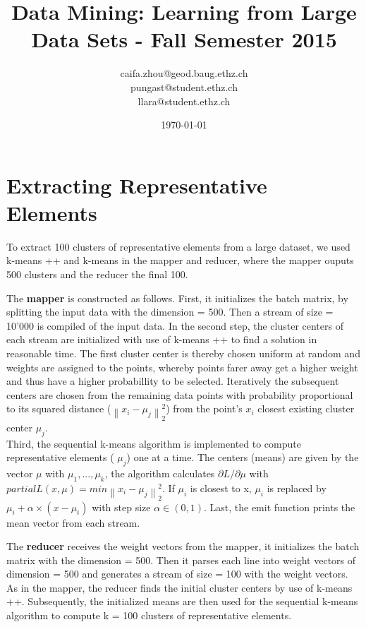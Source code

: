 \documentclass[a4paper, 11pt]{article}
\title{Data Mining: Learning from Large Data Sets - Fall Semester 2015}
\author{caifa.zhou@geod.baug.ethz.ch\\ pungast@student.ethz.ch\\ llara@student.ethz.ch\\}
\date{\today}
\begin{document}
\maketitle

\section*{Extracting Representative Elements} 

To extract 100 clusters of  representative elements from a large dataset, we used k-means ++ and k-means in the mapper and reducer, where the mapper ouputs 500 clusters and the reducer the final 100.

The \textbf{mapper} is constructed as follows. First, it initializes the batch matrix, by splitting the input data with the dimension = 500. Then a stream of size = 10'000 is compiled of the input data.
In the second step, the cluster centers of each stream are initialized with use of k-means ++ to find a solution in reasonable time. The first cluster center is thereby chosen uniform at random and weights are assigned to the points, whereby points farer away get a higher weight and thus have a higher probabillity to be selected. Iteratively the subsequent centers are chosen from the remaining data points with probability proportional to its squared distance ($\left \| x_{i} - \mu_{j} \right \|^{2}_{2}$) from the point's $x_{i}$ closest existing cluster center $\mu_{j}$. \\
Third, the sequential k-means algorithm is implemented to compute representative elements ( $\mu_{j}$) one at a time. The centers (means) are given by the vector $\mu$ with $\mu_{1},...,\mu_{k}$, the algorithm calculates $\partial L/\partial \mu$ with $ partial L(x,\mu) = min \left \| x_{i} - \mu_{j} \right \|^{2}_{2}$. If $\mu_{i}$ is closest to x,  $\mu_{i}$ is replaced by $\mu_{i}  + \alpha \times (x - \mu_{i})$ with step size  $\alpha \in (0,1)$. 
Last, the emit function prints the mean vector from each stream.

The \textbf{reducer} receives the weight vectors from the mapper, it initializes the batch matrix with the dimension = 500. Then it parses each line into weight vectors of dimension = 500 and generates a stream of size = 100 with the weight vectors. As in the mapper, the reducer finds the initial cluster centers by use of k-means ++. Subsequently, the initialized means are then used for the sequential k-means algorithm to compute k = 100 clusters of representative elements. \\ 
\end{document}
